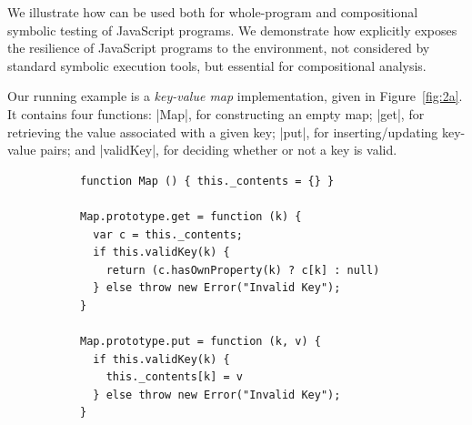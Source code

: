 
We illustrate how \cosette can be used both for whole-program and compositional symbolic testing of JavaScript programs. We demonstrate how \cosette  explicitly exposes the resilience of JavaScript programs to the environment, not considered by standard symbolic execution tools, but essential for compositional analysis.

Our running example is a \emph{key-value map} implementation, given in Figure~\ref{fig:2a}. It contains four functions: 
\jsinline|Map|, for constructing an empty map;
\jsinline|get|, for retrieving the value associated with a given key;
\jsinline|put|, for inserting/updating key-value pairs; and \jsinline|validKey|, for deciding whether or not a key is valid.

 \begin{figure}[t]
 \centering
 \begin{subfigure}[b]{0.33\textwidth}
 {
 \begin{lstlisting}
function Map () { this._contents = {} }

Map.prototype.get = function (k) {
  var c = this._contents;
  if this.validKey(k) {
    return (c.hasOwnProperty(k) ? c[k] : null)
  } else throw new Error("Invalid Key");
}

Map.prototype.put = function (k, v) {
  if this.validKey(k) {  
    this._contents[k] = v   
  } else throw new Error("Invalid Key");
} 


\end{lstlisting}}
\end{subfigure}
\end{figure}
